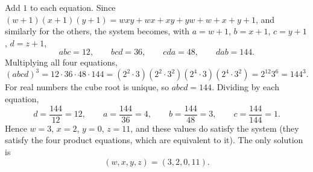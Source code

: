 Add $1$ to each equation. Since $(w+1)(x+1)(y+1)=wxy+wx+xy+yw+w+x+y+1$, and similarly for the others, the system becomes, with $a=w+1$, $b=x+1$, $c=y+1$, $d=z+1$,
\[
abc=12,\qquad bcd=36,\qquad cda=48,\qquad dab=144 .
\]
Multiplying all four equations,
\[
(abcd)^3=12\cdot36\cdot48\cdot144=\left(2^2\cdot3\right)\left(2^2\cdot3^2\right)\left(2^4\cdot3\right)\left(2^4\cdot3^2\right)=2^{12}3^{6}=144^3 .
\]
For real numbers the cube root is unique, so $abcd=144$. Dividing by each equation,
\[
d=\dfrac{144}{12}=12,\qquad a=\dfrac{144}{36}=4,\qquad b=\dfrac{144}{48}=3,\qquad c=\dfrac{144}{144}=1 .
\]
Hence $w=3$, $x=2$, $y=0$, $z=11$, and these values do satisfy the system (they satisfy the four product equations, which are equivalent to it). The only solution is
\[
(w,x,y,z)=\boxed{(3,2,0,11)}.
\]
